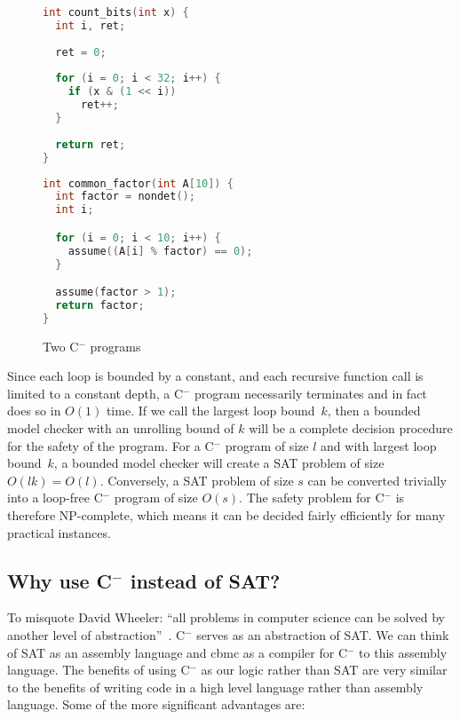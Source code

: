 \documentclass[a4paper]{llncs}
\newcommand{\newC}{C$^-$\xspace}
\begin{document}
\begin{figure}
\begin{minipage}[scale=0.8]{0.45\linewidth}
 \begin{lstlisting}[language=c]
int count_bits(int x) {
  int i, ret;
  
  ret = 0;
  
  for (i = 0; i < 32; i++) {
    if (x & (1 << i))
      ret++;
  }
  
  return ret;
}
 \end{lstlisting}
\end{minipage}
\begin{minipage}{0.54\linewidth}
 \begin{lstlisting}[language=C]
int common_factor(int A[10]) {
  int factor = nondet();
  int i;

  for (i = 0; i < 10; i++) {
    assume((A[i] % factor) == 0);
  }

  assume(factor > 1);
  return factor;
}

 \end{lstlisting}
\end{minipage}

 \caption{Two \newC programs}
 \label{fig:c-}

\end{figure}

Since each loop is bounded by a constant, and each recursive function call is
limited to a constant depth, a \newC program necessarily terminates and in
fact does so in $O(1)$ time.  If we call the largest loop bound~$k$, then
a bounded model checker with an unrolling bound of $k$ will be a complete
decision procedure for the safety of the program.  For a \newC program of
size $l$ and with largest loop bound~$k$, a bounded model checker will
create a SAT problem of size $O(lk) = O(l)$.  Conversely, a SAT problem
of size $s$ can be converted trivially into a loop-free \newC program
of size $O(s)$.  The safety problem for \newC is therefore NP-complete,
which means it can be decided fairly efficiently for many practical
instances.

\subsection{Why use \newC instead of SAT?}
To misquote David Wheeler: ``all problems in computer science can be solved by
another level of abstraction''~\cite{beautiful-code}.  \newC serves as
an abstraction of SAT.  We can think of SAT as an assembly language and
{\sc cbmc} as a compiler for \newC to this assembly language.  The benefits
of using \newC as our logic rather than SAT are very similar to the benefits of
writing code in a high level language rather than assembly language.
Some of the more significant advantages are:
\end{document}
